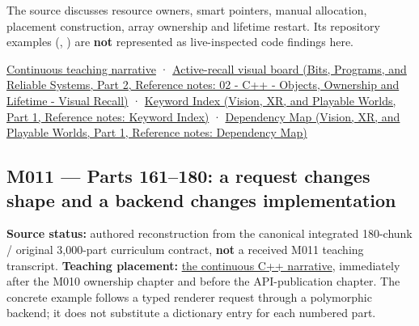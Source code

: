 The source discusses resource owners, smart pointers, manual allocation, placement construction, array ownership and lifetime restart. Its repository examples (, ) are \textbf{not} represented as live-inspected code findings here.

\hyperref[01-foundations-i-ch004-from-a-live-object-to-responsible-resource-ownership]{Continuous teaching narrative} · \href{../01-Bits-Programs-and-Reliable-Systems-P02/main.pdf\#nameddest=appendix-960160274237}{Active-recall visual board (Bits, Programs, and Reliable Systems, Part 2, Reference notes: 02 - C++ - Objects, Ownership and Lifetime - Visual Recall)} · \href{../07-Vision-XR-and-Playable-Worlds-P01/main.pdf\#nameddest=appendix-a6d556a4ef50}{Keyword Index (Vision, XR, and Playable Worlds, Part 1, Reference notes: Keyword Index)} · \href{../07-Vision-XR-and-Playable-Worlds-P01/main.pdf\#nameddest=appendix-4ad47bdd269a}{Dependency Map (Vision, XR, and Playable Worlds, Part 1, Reference notes: Dependency Map)}

\subsection{M011 --- Parts 161--180: a request changes shape and a backend changes implementation}\label{appendix-fd090d982a15-m011-parts-161180-a-request-changes-shape-and-a-backend-changes-implementation}

\hypertarget{appendix-fd090d982a15-m011-parts-161180-a-request-changes-shape-and-a-backend-changes-implementation}{}

\textbf{Source status:} authored reconstruction from the canonical integrated 180-chunk / original 3,000-part curriculum contract, \textbf{not} a received M011 teaching transcript. \textbf{Teaching placement:} \hyperref[01-foundations-i-ch004-from-one-owned-resource-to-many-requests-and-a-replaceable-backend]{the continuous C++ narrative}, immediately after the M010 ownership chapter and before the API-publication chapter. The concrete example follows a typed renderer request through a polymorphic backend; it does not substitute a dictionary entry for each numbered part.

